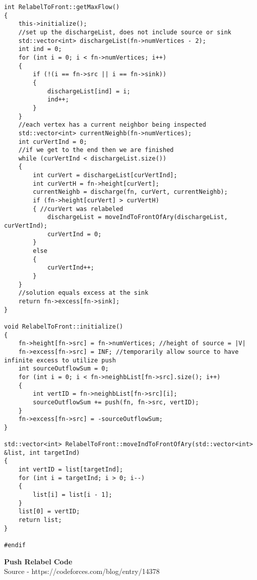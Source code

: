 \documentclass[a4paper]{article}
\begin{document}
\begin{verbatim}
int RelabelToFront::getMaxFlow()
{
    this->initialize();
    //set up the dischargeList, does not include source or sink
    std::vector<int> dischargeList(fn->numVertices - 2);
    int ind = 0;
    for (int i = 0; i < fn->numVertices; i++)
    {
        if (!(i == fn->src || i == fn->sink))
        {
            dischargeList[ind] = i;
            ind++;
        }
    }
    //each vertex has a current neighbor being inspected
    std::vector<int> currentNeighb(fn->numVertices);
    int curVertInd = 0;
    //if we get to the end then we are finished
    while (curVertInd < dischargeList.size())
    {
        int curVert = dischargeList[curVertInd];
        int curVertH = fn->height[curVert];
        currentNeighb = discharge(fn, curVert, currentNeighb);
        if (fn->height[curVert] > curVertH)
        { //curVert was relabeled
            dischargeList = moveIndToFrontOfAry(dischargeList, curVertInd);
            curVertInd = 0;
        }
        else
        {
            curVertInd++;
        }
    }
    //solution equals excess at the sink
    return fn->excess[fn->sink];
}

void RelabelToFront::initialize()
{
    fn->height[fn->src] = fn->numVertices; //height of source = |V|
    fn->excess[fn->src] = INF; //temporarily allow source to have infinite excess to utilize push
    int sourceOutflowSum = 0;
    for (int i = 0; i < fn->neighbList[fn->src].size(); i++)
    {
        int vertID = fn->neighbList[fn->src][i];
        sourceOutflowSum += push(fn, fn->src, vertID);
    }
    fn->excess[fn->src] = -sourceOutflowSum;
}

std::vector<int> RelabelToFront::moveIndToFrontOfAry(std::vector<int> &list, int targetInd)
{
    int vertID = list[targetInd];
    for (int i = targetInd; i > 0; i--)
    {
        list[i] = list[i - 1];
    }
    list[0] = vertID;
    return list;
}

#endif
    \end{verbatim}

    \newpage
    \textbf{Push Relabel Code} \\ 
    Source - https://codeforces.com/blog/entry/14378
\end{document}
